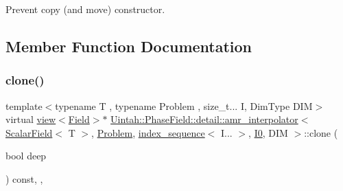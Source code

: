 Prevent copy (and move) constructor. 



\subsection{Member Function Documentation}
\mbox{\label{classUintah_1_1PhaseField_1_1detail_1_1amr__interpolator_3_01ScalarField_3_01T_01_4_00_01Problem64f2458f98b03e27672a091eecc4b696_a6bdc935e6a1d72f8437cbe1b37dcb12c}} 
\subsubsection{\texorpdfstring{clone()}{clone()}\hspace{0.1cm}{\footnotesize\ttfamily [1/2]}}
{\footnotesize\ttfamily template$<$typename T , typename Problem , size\+\_\+t... I, Dim\+Type D\+IM$>$ \\
virtual \hyperlink{classUintah_1_1PhaseField_1_1detail_1_1view}{view}$<$\hyperlink{structUintah_1_1PhaseField_1_1ScalarField}{Field}$>$$\ast$ \hyperlink{classUintah_1_1PhaseField_1_1detail_1_1amr__interpolator}{Uintah\+::\+Phase\+Field\+::detail\+::amr\+\_\+interpolator}$<$ \hyperlink{structUintah_1_1PhaseField_1_1ScalarField}{Scalar\+Field}$<$ T $>$, \hyperlink{classUintah_1_1PhaseField_1_1Problem}{Problem}, \hyperlink{namespaceUintah_1_1PhaseField_a237de804d99512e50613aff7c94a9461}{index\+\_\+sequence}$<$ I... $>$, \hyperlink{namespaceUintah_1_1PhaseField_a547ce3002aa97fbd3ef3192a6eec8406abdd8ebcbdfd71d1125937e3012dc45fb}{I0}, D\+IM $>$\+::clone (\begin{DoxyParamCaption}\item[{bool}]{deep }\end{DoxyParamCaption}) const\hspace{0.3cm}{\ttfamily [inline]}, {\ttfamily [override]}, {\ttfamily [virtual]}}



